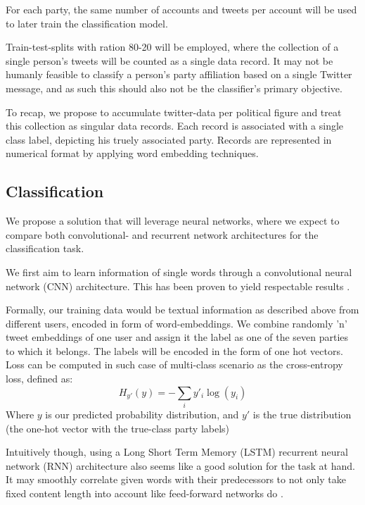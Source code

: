 \documentclass[10pt, oneside]{article}
\begin{document}
\begin{multicols}{2}
For each party, the same number of accounts and tweets per account will be used to later train the classification model.

Train-test-splits with ration 80-20 will be employed, where the collection of a single person's tweets will be counted as a single data record. It may not be humanly feasible to classify a person's party affiliation based on a single Twitter message, and as such this should also not be the classifier's primary objective.

To recap, we propose to accumulate twitter-data per political figure and treat this collection as singular data records. Each record is associated with a single class label, depicting his truely associated party. Records are represented in numerical format by applying word embedding techniques. 

\subsection{Classification}

We propose a solution that will leverage neural networks, where we expect to compare both convolutional- and recurrent network architectures for the classification task.

We first aim to learn information of single words through a convolutional neural network (CNN) architecture. This has been proven to yield respectable results \cite{Kim2014}.

Formally, our training data would be textual information as described above from different users, encoded in form of word-embeddings. We combine randomly 'n' tweet embeddings of one user and assign it the label as one of the seven parties to which it belongs. The labels will be encoded in the form of one hot vectors. Loss can be computed in such case of multi-class scenario as the cross-entropy loss, defined as:
\begin{equation}
H_{y'}(y) = - \sum_{i} y'_{i} \log (y_{i})
\end{equation}
Where \(y\) is our predicted probability distribution, and \(y'\) is the true distribution (the one-hot vector with the true-class party labels) 

Intuitively though, using a Long Short Term Memory (LSTM) recurrent neural network (RNN) architecture also seems like a good solution for the task at hand. It may smoothly correlate given words with their predecessors to not only take fixed content length into account like feed-forward networks do \cite{Sundermeyer2012lstm}.


\end{multicols}
\end{document}
